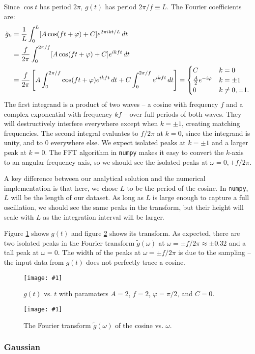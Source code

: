 \documentclass{article}
\theoremstyle{definition}
\newcommand{\cc}{\texttt}
\newcommand{\plop}[2]{
    \begin{figure}[ht!]\centering
        \texttt{[image: \#1]}
        \caption{\label{#1}#2}
    \end{figure}
}
\begin{document}
Since $\cos t$ has period $2\pi$, $g(t)$ has period $2\pi/f \equiv L$.
The Fourier coefficients are:
\begin{align*}
\tilde g_k
&= {1 \over L} \int_0^L [A \cos(ft + \varphi) + C]
e^{2\pi i k t / L} \, dt \\
&= {f \over 2\pi} \int_0^{2\pi/f} [A \cos(ft + \varphi) + C]
e^{i k f t} \, dt \\
&= {f \over 2\pi}
\left[
A \int_0^{2\pi/f} \cos(ft + \varphi)
e^{i k f t} \, dt
+ C  \int_0^{2\pi/f}
e^{i k f t} \, dt
\right]
=
\begin{cases}
C & k = 0 \\
{A \over 2} e^{-i\varphi} & k = \pm 1 \\
0 & k \not= 0, \pm 1.
\end{cases}
\end{align*}
The first integrand is a product of two waves -- a cosine with
frequency $f$ and a complex exponential with frequency $kf$ --
over full periods of both waves.
They will destructively interfere everywhere except when $k = \pm 1$,
creating matching frequencies.
The second integral evaluates to $f/2\pi$ at $k = 0$, since the integrand
is unity, and to 0 everywhere else.
We expect isolated peaks at $k = \pm 1$ and a larger
peak at $k = 0$. The FFT algorithm in
\cc{numpy} makes it easy to convert the $k$-axis to an angular
frequency axis, so we should see the
isolated peaks at $\omega = 0, \pm f/2\pi$.

A key difference between our analytical solution and the numerical
implementation is that here, we chose $L$ to be the period of the cosine.
In \cc{numpy}, $L$ will be the length of our dataset. As long as $L$
is large enough to capture a full oscillation, we should see the
same peaks in the transform, but their height will scale with $L$ as
the integration interval will be larger.

Figure \ref{g.pdf} shows $g(t)$ and figure \ref{Fg.pdf} shows its
transform.
As expected, there are two isolated peaks in the Fourier transform
$\tilde g(\omega)$ at $\omega = \pm f/2\pi \approx \pm 0.32$ and
a tall peak at $\omega = 0$. The width
of the peaks at $\omega = \pm f/2\pi$
is due to the sampling -- the input data from
$g(t)$ does not perfectly trace a cosine.
\plop{g.pdf}{$g(t)$ vs. $t$ with paramaters
$A = 2$, $f = 2$, $\varphi = \pi/2$, and $C = 0$.}
\plop{Fg.pdf}{The Fourier transform $\tilde g(\omega)$ of the cosine
vs. $\omega$.}


\subsubsection{Gaussian}
\end{document}
